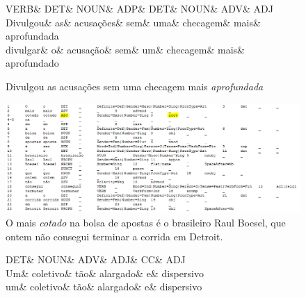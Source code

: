 \documentclass[output=paper,colorlinks,citecolor=brown]{langscibook}
\begin{document}
\begin{enumerate}
		\begin{figure}[htbp]
				\centering
				\vspace{.8cm}
				\begin{dependency}
					\begin{deptext}
						VERB\& DET\& NOUN\& ADP\& DET\& NOUN\& ADV\& ADJ\\
						Divulgou\& as\& acusações\& sem\& uma\& checagem\& mais\& aprofundada\\
						divulgar\& o\& acusação\& sem\& um\& checagem\& mais\& aprofundado\\
					\end{deptext}
					
				\end{dependency}
				\caption{Divulgou as acusações sem uma checagem mais \emph{aprofundada}}
				\label{fig:partDIF2}
			\end{figure}

			\begin{figure}
			\centering
			\includegraphics[width=\textwidth,height=\textheight,keepaspectratio]{imagesDrive/image19.png}
			\caption{O mais \emph{cotado} na bolsa de apostas é o brasileiro Raul Boesel, que ontem não consegui terminar a corrida em Detroit.}	
			\label{fig:partDIF3}
		\end{figure}
			
			\begin{figure}[htbp]
			\centering
			\vspace{.8cm}
			\begin{dependency}
				\begin{deptext}
					DET\& NOUN\& ADV\& ADJ\& CC\& ADJ\\
					Um\& coletivo\& tão\& alargado\& e\& dispersivo\\
					um\& coletivo\& tão\& alargado\& e\& dispersivo\\
				\end{deptext}
				

\end{dependency}
\end{figure}
\end{enumerate}
\end{document}
